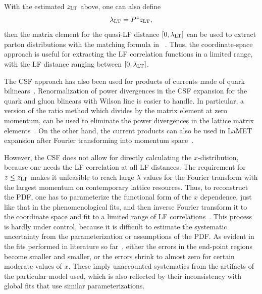 With the estimated $z_{\rm LT}$ above, one can also define
\begin{equation}
       \lambda_{\rm LT} = P^zz_{\rm LT},
\end{equation}
then the matrix element for the quasi-LF distance $[0, \lambda_{\rm LT}]$
can be used to extract parton distributions with the matching formula in ~\cite{Radyushkin:2017cyf,Ji:2017rah,Izubuchi:2018srq}.
Thus, the coordinate-space approach is useful for extracting the LF correlation functions in a limited range, with the LF distance ranging between $[0,\lambda_{\rm LT}]$.

The CSF approach has also been used for products of currents made of
quark bilinears~\cite{Detmold:2005gg,Braun:2007wv,Bali:2017gfr,Bali:2018spj,Ma:2017pxb,Detmold:2018kwu,Sufian:2019bol,Sufian:2020vzb}.
Renormalization of power divergences in the
CSF expansion for the quark and gluon blinears with Wilson line
is easier to handle. In particular, a version of the ratio method
which  divides by the matrix element at zero momentum, can be used to
eliminate the power divergences in the lattice matrix elements~\cite{Radyushkin:2017cyf,Orginos:2017kos}.
On the other hand, the current products can also be used
in LaMET expansion after Fourier transforming into momentum
space~\cite{Ji:2020ect}.

However, the CSF does not allow for directly calculating the $x$-distribution, because one needs
the LF correlation at all LF distances. The requirement for $z\le z_{\rm LT}$ makes it unfeasible
to reach large $\lambda$ values for the Fourier transform with the largest momentum on contemporary lattice resources. Thus, to reconstruct
the PDF, one has to parameterize the functional form of the $x$ dependence, just like that
in the phenomenological fits, and then
inverse Fourier transform it to the coordinate space and fit to a limited range
of LF correlations~\cite{Orginos:2017kos,Karpie:2018zaz,Joo:2019bzr,Joo:2019jct,Sufian:2019bol,Joo:2020spy,Sufian:2020vzb,Bhat:2020ktg,Gao:2020ito,Fan:2020cpa}.
This process is hardly under control, because it is difficult to estimate
the systematic uncertainty from the parameterization or assumptions of the PDF. As evident in the fits performed in literature so far~\cite{Joo:2019bzr,Joo:2019jct,Sufian:2019bol,Joo:2020spy,Gao:2020ito,Fan:2020cpa}, either the errors in the end-point regions become smaller and smaller, or the errors shrink to almost zero for certain moderate values of $x$. These imply unaccounted systematics from the artifacts of the particular model used, which is also reflected by their inconsistency with global fits that use similar parameterizations.

